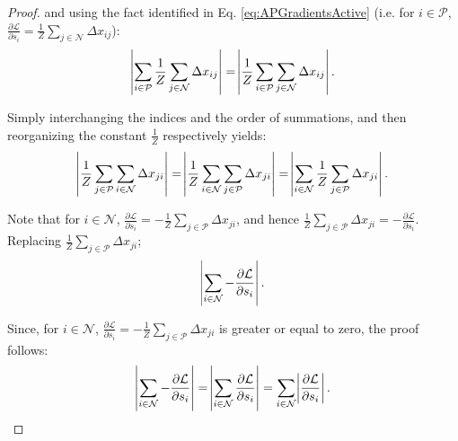 \documentclass{article}
\begin{document}
\begin{proof}
and using the fact identified in Eq. \eqref{eq:APGradientsActive} (i.e. for $i \in \mathcal{P}$, $\frac{\partial \mathcal{L}}{\partial s_i} =  \frac{1}{Z} \sum \limits_{j \in \mathcal{N}} \Delta x_{ij}$):
\begin{align}
\label{eq:GradientsToUpdates}
\abs{ \sum \limits_{i \in \mathcal{P}} \frac{1}{Z} \sum \limits_{j \in \mathcal{N}} \Delta x_{ij}} =  \abs{\frac{1}{Z} \sum \limits_{i \in \mathcal{P}} \sum \limits_{j \in \mathcal{N}} \Delta x_{ij}} .
\end{align}

Simply interchanging the indices and the order of summations, and then reorganizing the constant $\frac{1}{Z}$ respectively yields:
\begin{align}
\abs{ \frac{1}{Z} \sum \limits_{j \in \mathcal{P}} \sum \limits_{i \in \mathcal{N}} \Delta x_{ji}}
= \abs{  \frac{1}{Z} \sum \limits_{i \in \mathcal{N}} \sum \limits_{j \in \mathcal{P}} \Delta x_{ji}} 
= \abs{  \sum \limits_{i \in \mathcal{N}} \frac{1}{Z} \sum \limits_{j \in \mathcal{P}} \Delta x_{ji}}.
\end{align}

Note that for $i \in \mathcal{N}$, $\frac{\partial \mathcal{L}}{\partial s_i} = - \frac{1}{Z} \sum \limits_{j \in \mathcal{P}} \Delta x_{ji}$, and hence $ \frac{1}{Z} \sum \limits_{j \in \mathcal{P}} \Delta x_{ji} = - \frac{\partial \mathcal{L}}{\partial s_i} $. Replacing $ \frac{1}{Z} \sum \limits_{j \in \mathcal{P}} \Delta x_{ji}$;
\begin{align}
\abs{  \sum \limits_{i \in \mathcal{N}} - \frac{\partial \mathcal{L}}{\partial s_i}}.
\end{align}

Since, for $i \in \mathcal{N}$, $\frac{\partial \mathcal{L}}{\partial s_i} = - \frac{1}{Z} \sum \limits_{j \in \mathcal{P}} \Delta x_{ji}$ is greater or equal to zero, the proof follows:
\begin{align}
\abs{  \sum \limits_{i \in \mathcal{N}} - \frac{\partial \mathcal{L}}{\partial s_i}}
=\abs{  \sum \limits_{i \in \mathcal{N}} \frac{\partial \mathcal{L}}{\partial s_i}}
=\sum \limits_{i \in \mathcal{N}}\abs{ \frac{\partial \mathcal{L}}{\partial s_i}}.
\end{align}

\end{proof}
\end{document}
